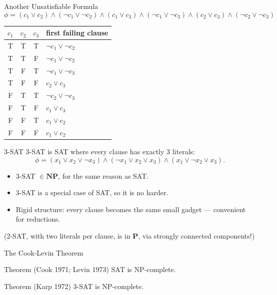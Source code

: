 \documentclass[10pt,aspectratio=169]{beamer}
\begin{document}
\begin{frame}{Another Unsatisfiable Formula}
  \[
    \phi =
    (c_1 \lor c_2) \land (\neg c_1 \lor \neg c_2) \land
    (c_1 \lor c_3) \land (\neg c_1 \lor \neg c_3) \land
    (c_2 \lor c_3) \land (\neg c_2 \lor \neg c_3)
  \]

  \medskip
  \begin{center}
  \begin{tabular}{ccc|l}
    \toprule
    $c_1$ & $c_2$ & $c_3$ & first failing clause \\
    \midrule
    T & T & T & $\neg c_1 \lor \neg c_2$ \\
    T & T & F & $\neg c_1 \lor \neg c_2$ \\
    T & F & T & $\neg c_1 \lor \neg c_3$ \\
    T & F & F & $c_2 \lor c_3$ \\
    F & T & T & $\neg c_2 \lor \neg c_3$ \\
    F & T & F & $c_1 \lor c_3$ \\
    F & F & T & $c_1 \lor c_2$ \\
    F & F & F & $c_1 \lor c_2$ \\
    \bottomrule
  \end{tabular}
  \end{center}
\end{frame}

\begin{frame}{3-SAT}
  \alert{3-SAT} is SAT where every clause has \alert{exactly 3} literals:
  \[
    \phi = (x_1 \lor x_2 \lor \neg x_3) \land
           (\neg x_1 \lor x_2 \lor x_3) \land
           (x_1 \lor \neg x_2 \lor x_3).
  \]

  \begin{itemize}
    \item 3-SAT $\in \mathbf{NP}$, for the same reason as SAT.
    \item 3-SAT is a special case of SAT, so it is no harder.
    \item Rigid structure: every clause becomes the same small
          \alert{gadget} — convenient for reductions.
  \end{itemize}

  \bigskip
  \small (2-SAT, with two literals per clause, is in $\mathbf{P}$, via
  strongly connected components!)
\end{frame}

\begin{frame}{The Cook-Levin Theorem}
  \begin{block}{Theorem (Cook 1971; Levin 1973)}
    SAT is NP-complete.
  \end{block}

  \pause

  \begin{block}{Theorem (Karp 1972)}
    3-SAT is NP-complete.
  \end{block}

\end{frame}
\end{document}
